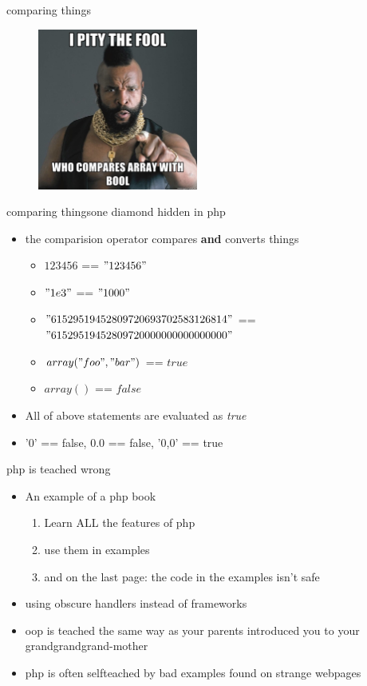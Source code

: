 \documentclass[final]{beamer}
\begin{document}
\begin{frame}{comparing things}
\begin{center}
\begin{figure}[ht]
  \centering
	\includegraphics[height=200px]{./../Graph/Meme/Mr_T.jpg}
\end{figure}
\end{center}
\end{frame}


\begin{frame}{comparing things}{one diamond hidden in php}
\begin{itemize}
	\item the comparision operator compares \textbf{and} converts things
	\begin{itemize}
		\item $123456$ == $" 123456"$
		\item $"1e3"$ == $"1000"$
		\item $"61529519452809720693702583126814"$   ==  $"61529519452809720000000000000000"$
		\item $array("foo","bar")$ == $true$
		\item $array()$ == $false$
	\end{itemize}
	\item All of above statements are evaluated as \textit{true} 
	\item '0' == false, 0.0 == false, '0,0' == true
\end{itemize}
\end{frame}


\begin{frame}{php is teached wrong}
\begin{itemize}
	\item An example of a php book
	\begin{enumerate}
		\item Learn ALL the features of php
		\item use them in examples
		\item and on the last page: the code in the examples isn't safe
	\end{enumerate}
	\item using obscure handlers instead of frameworks
	\item oop is teached the same way as your parents introduced you to your grandgrandgrand-mother
	\item php is often selfteached by bad examples found on strange webpages
\end{itemize}
\end{frame}
\end{document}
